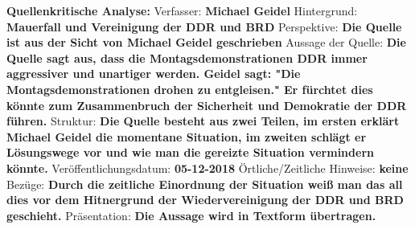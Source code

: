 \documentclass{article}
\begin{document}
%

\textbf{Quellenkritische Analyse:}\newline
Verfasser: \textbf{Michael Geidel}\newline
Hintergrund: \textbf{Mauerfall und Vereinigung der DDR und BRD}\newline
Perspektive: \textbf{Die Quelle ist aus der Sicht von Michael Geidel geschrieben}\newline
Aussage der Quelle: \textbf{Die Quelle sagt aus, dass die Montagsdemonstrationen DDR immer aggressiver und unartiger werden. Geidel sagt: "Die Montagsdemonstrationen drohen zu entgleisen." Er fürchtet dies könnte zum Zusammenbruch der Sicherheit und Demokratie der DDR führen.}\newline
Struktur: \textbf{Die Quelle besteht aus zwei Teilen, im ersten erklärt Michael Geidel die momentane Situation, im zweiten schlägt er Lösungswege vor und wie man die gereizte Situation vermindern könnte.}\newline
Veröffentlichungsdatum: \textbf{05-12-2018}\newline
Örtliche/Zeitliche Hinweise: \textbf{keine}\newline
Bezüge: \textbf{Durch die zeitliche Einordnung der Situation weiß man das all dies vor dem Hitnergrund der Wiedervereinigung der DDR und BRD geschieht.}\newline
Präsentation: \textbf{Die Aussage wird in Textform übertragen.}\newline
\end{document}
